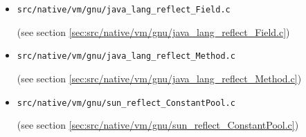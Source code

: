 \documentclass[a4paper, 10pt, titlepage]{scrartcl} %
\begin{document}
\begin{itemize}
 \item \begin{scriptsize}\verb|src|\hspace{0.0pt}\verb|/|\hspace{0.0pt}\verb|native|\hspace{0.0pt}\verb|/|\hspace{0.0pt}\verb|vm|\hspace{0.0pt}\verb|/|\hspace{0.0pt}\verb|gnu|\hspace{0.0pt}\verb|/|\hspace{0.0pt}\verb|java_lang_reflect_Field|\hspace{0.0pt}\verb|.|\hspace{0.0pt}\verb|c|\end{scriptsize} (see section \ref{sec:src/native/vm/gnu/java_lang_reflect_Field.c})
 \item \begin{scriptsize}\verb|src|\hspace{0.0pt}\verb|/|\hspace{0.0pt}\verb|native|\hspace{0.0pt}\verb|/|\hspace{0.0pt}\verb|vm|\hspace{0.0pt}\verb|/|\hspace{0.0pt}\verb|gnu|\hspace{0.0pt}\verb|/|\hspace{0.0pt}\verb|java_lang_reflect_Method|\hspace{0.0pt}\verb|.|\hspace{0.0pt}\verb|c|\end{scriptsize} (see section \ref{sec:src/native/vm/gnu/java_lang_reflect_Method.c})
 \item \begin{scriptsize}\verb|src|\hspace{0.0pt}\verb|/|\hspace{0.0pt}\verb|native|\hspace{0.0pt}\verb|/|\hspace{0.0pt}\verb|vm|\hspace{0.0pt}\verb|/|\hspace{0.0pt}\verb|gnu|\hspace{0.0pt}\verb|/|\hspace{0.0pt}\verb|sun_reflect_ConstantPool|\hspace{0.0pt}\verb|.|\hspace{0.0pt}\verb|c|\end{scriptsize} (see section \ref{sec:src/native/vm/gnu/sun_reflect_ConstantPool.c})

\end{itemize}
\end{document}
